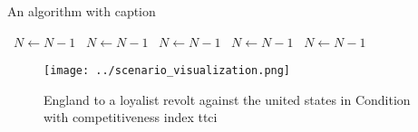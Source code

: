 \documentclass[a4paper]{article}
\begin{document}
\begin{algorithm}
\caption{An algorithm with caption}
\begin{algorithmic}
\    \State $N \gets N - 1$
\    \State $N \gets N - 1$
\    \State $N \gets N - 1$
\    \State $N \gets N - 1$
\    \State $N \gets N - 1$
\EndWhile
\end{algorithmic}
\end{algorithm}

\begin{figure}
\centering
\texttt{[image: ../scenario\_visualization.png]}
\caption{England to a loyalist revolt against the united states in Condition with competitiveness index ttci
}
\end{figure}
 
\end{document}
